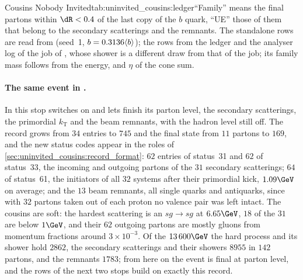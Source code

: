 \begin{ledgerboth}{Cousins Nobody Invited}{tab:uninvited_cousins:ledger}{``Family''
means the final partons within $\dR<0.4$ of the last copy of the $b$
quark, ``UE'' those of them that belong to the secondary scatterings and
the remnants. The standalone rows are read from
 (seed~1, $b=0.3136\langle b\rangle$); the \CMSSW
rows from the ledger and the analyser log of the  job of
, whose shower is a different draw from that of the
 job; its family mass follows from the energy, \pt and $\eta$
of the cone sum.}
\end{ledgerboth}

\paragraph{The same event in \CMSSW.} In \CMSSW this stop switches on
 and lets \PYTHIA finish its parton level, the
secondary scatterings, the primordial $k_{\mathrm{T}}$ and the beam
remnants, with the hadron level still off. The record grows from $34$
entries to $745$ and the final state from $11$ partons to $169$, and the
new status codes appear in the roles of
\cref{sec:uninvited_cousins:record_format}: $62$ entries of status~31 and
$62$ of status~33, the incoming and outgoing partons of the $31$ secondary
scatterings; $64$ of status~61, the initiators of all $32$ systems after
their primordial kick, $1.09\GeV$ on average; and the $13$ beam remnants,
all single quarks and antiquarks, since with $32$ partons taken out of
each proton no valence pair was left intact. The cousins are soft: the
hardest scattering is an $sg\to sg$ at $6.65\GeV$, $18$ of the $31$ are
below $1\GeV$, and their $62$ outgoing partons are mostly gluons from
momentum fractions around $3\times10^{-3}$. Of the $13\,600\GeV$ the hard
process and its shower hold $2862$, the secondary scatterings and their
showers $8955$ in $142$ partons, and the remnants $1783$; from here on the
event is final at parton level, and the \CMSSW rows of the next two stops
build on exactly this record.


